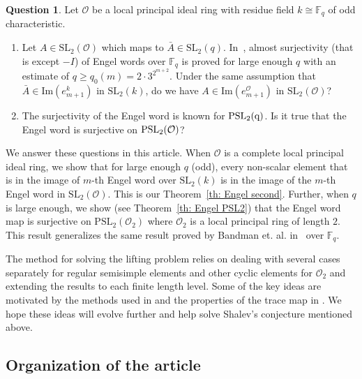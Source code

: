\documentclass[10pt,twoside]{amsart}
\newcommand{\SL}{\mathrm{SL}}
\theoremstyle{definition}
\theoremstyle{definition}
\newtheorem{question}[theorem]{Question}
\begin{document}
\begin{question}
Let $\mathcal{O}$ be a local principal ideal ring with residue field $k\cong \mathbb{F}_q$ of odd characteristic.
\begin{enumerate}
\item Let $A\in \mathrm{SL}_2(\mathcal{O})$ which maps to $\bar A \in \SL_2(q)$. In~\cite[Theorem 5.1]{BandmanGarionGrunewald2012}, almost surjectivity (that is except $-I$) of Engel words over $\mathbb F_q$ is proved for large enough $q$ with an estimate of $q \geq q_0(m) = 2\cdot3^{2^{m+2}}$. Under the same assumption that $\bar A\in \mathrm{Im}(e_{m+1}^k)$ in $\mathrm{SL}_2(k)$, do we have $A\in  \mathrm{Im}(e_{m+1}^{\mathcal{O}}) $ in $\mathrm{SL}_2(\mathcal{O})$?
\item The surjectivity of the Engel word is known for $\rm{PSL}_2(q)$. Is it true that the Engel word is surjective on $\rm{PSL}_2(\mathcal O)$? 
\end{enumerate}
\end{question}
\noindent We answer these questions in this article. When $\mathcal{O}$ is a complete local principal ideal ring, we show that for large enough $q$ (odd), every non-scalar element that is in the image of $m$-th Engel word over $\SL_2(k)$ is in the image of the $m$-th Engel word in $\SL_2(\mathcal O)$. This is our Theorem~\ref{th: Engel second}. Further, when $q$ is large enough, we show (see Theorem~\ref{th: Engel PSL2}) that the Engel word map is surjective on $\text{PSL}_2(\mathcal O_2)$ where $\mathcal O_2$ is a local principal ring of length $2$. This result generalizes the same result proved by Bandman et. al. in~\cite{BandmanGarionGrunewald2012} over $\mathbb F_q$. 

The method for solving the lifting problem relies on dealing with several cases separately for regular semisimple elements and other cyclic elements for $\mathcal{O}_2$ and extending the results to each finite length level. Some of the key ideas are motivated by the methods used in \cite{AvniGelanderKassabovShalev} and the properties of the trace map in \cite{BandmanGarionGrunewald2012}. We hope these ideas will evolve further and help solve Shalev's conjecture mentioned above.


\subsection{Organization of the article}
\end{document}
